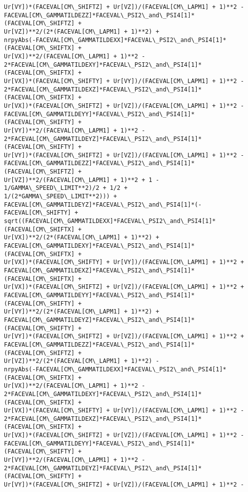 \documentclass[landscape,letterpaper,10pt,english]{article}
\begin{document}
\begin{Verbatim}[commandchars=\\\{\}]
Ur[VY])*(FACEVAL[CM\_SHIFTZ] + Ur[VZ])/(FACEVAL[CM\_LAPM1] + 1)**2 -
FACEVAL[CM\_GAMMATILDEZZ]*FACEVAL\_PSI2\_and\_PSI4[1]*(FACEVAL[CM\_SHIFTZ] +
Ur[VZ])**2/(2*(FACEVAL[CM\_LAPM1] + 1)**2) +
nrpyAbs(-FACEVAL[CM\_GAMMATILDEXX]*FACEVAL\_PSI2\_and\_PSI4[1]*(FACEVAL[CM\_SHIFTX] +
Ur[VX])**2/(FACEVAL[CM\_LAPM1] + 1)**2 -
2*FACEVAL[CM\_GAMMATILDEXY]*FACEVAL\_PSI2\_and\_PSI4[1]*(FACEVAL[CM\_SHIFTX] +
Ur[VX])*(FACEVAL[CM\_SHIFTY] + Ur[VY])/(FACEVAL[CM\_LAPM1] + 1)**2 -
2*FACEVAL[CM\_GAMMATILDEXZ]*FACEVAL\_PSI2\_and\_PSI4[1]*(FACEVAL[CM\_SHIFTX] +
Ur[VX])*(FACEVAL[CM\_SHIFTZ] + Ur[VZ])/(FACEVAL[CM\_LAPM1] + 1)**2 -
FACEVAL[CM\_GAMMATILDEYY]*FACEVAL\_PSI2\_and\_PSI4[1]*(FACEVAL[CM\_SHIFTY] +
Ur[VY])**2/(FACEVAL[CM\_LAPM1] + 1)**2 -
2*FACEVAL[CM\_GAMMATILDEYZ]*FACEVAL\_PSI2\_and\_PSI4[1]*(FACEVAL[CM\_SHIFTY] +
Ur[VY])*(FACEVAL[CM\_SHIFTZ] + Ur[VZ])/(FACEVAL[CM\_LAPM1] + 1)**2 -
FACEVAL[CM\_GAMMATILDEZZ]*FACEVAL\_PSI2\_and\_PSI4[1]*(FACEVAL[CM\_SHIFTZ] +
Ur[VZ])**2/(FACEVAL[CM\_LAPM1] + 1)**2 + 1 - 1/GAMMA\_SPEED\_LIMIT**2)/2 + 1/2 +
1/(2*GAMMA\_SPEED\_LIMIT**2))) +
FACEVAL[CM\_GAMMATILDEYZ]*FACEVAL\_PSI2\_and\_PSI4[1]*(-FACEVAL[CM\_SHIFTY] +
sqrt((FACEVAL[CM\_GAMMATILDEXX]*FACEVAL\_PSI2\_and\_PSI4[1]*(FACEVAL[CM\_SHIFTX] +
Ur[VX])**2/(2*(FACEVAL[CM\_LAPM1] + 1)**2) +
FACEVAL[CM\_GAMMATILDEXY]*FACEVAL\_PSI2\_and\_PSI4[1]*(FACEVAL[CM\_SHIFTX] +
Ur[VX])*(FACEVAL[CM\_SHIFTY] + Ur[VY])/(FACEVAL[CM\_LAPM1] + 1)**2 +
FACEVAL[CM\_GAMMATILDEXZ]*FACEVAL\_PSI2\_and\_PSI4[1]*(FACEVAL[CM\_SHIFTX] +
Ur[VX])*(FACEVAL[CM\_SHIFTZ] + Ur[VZ])/(FACEVAL[CM\_LAPM1] + 1)**2 +
FACEVAL[CM\_GAMMATILDEYY]*FACEVAL\_PSI2\_and\_PSI4[1]*(FACEVAL[CM\_SHIFTY] +
Ur[VY])**2/(2*(FACEVAL[CM\_LAPM1] + 1)**2) +
FACEVAL[CM\_GAMMATILDEYZ]*FACEVAL\_PSI2\_and\_PSI4[1]*(FACEVAL[CM\_SHIFTY] +
Ur[VY])*(FACEVAL[CM\_SHIFTZ] + Ur[VZ])/(FACEVAL[CM\_LAPM1] + 1)**2 +
FACEVAL[CM\_GAMMATILDEZZ]*FACEVAL\_PSI2\_and\_PSI4[1]*(FACEVAL[CM\_SHIFTZ] +
Ur[VZ])**2/(2*(FACEVAL[CM\_LAPM1] + 1)**2) -
nrpyAbs(-FACEVAL[CM\_GAMMATILDEXX]*FACEVAL\_PSI2\_and\_PSI4[1]*(FACEVAL[CM\_SHIFTX] +
Ur[VX])**2/(FACEVAL[CM\_LAPM1] + 1)**2 -
2*FACEVAL[CM\_GAMMATILDEXY]*FACEVAL\_PSI2\_and\_PSI4[1]*(FACEVAL[CM\_SHIFTX] +
Ur[VX])*(FACEVAL[CM\_SHIFTY] + Ur[VY])/(FACEVAL[CM\_LAPM1] + 1)**2 -
2*FACEVAL[CM\_GAMMATILDEXZ]*FACEVAL\_PSI2\_and\_PSI4[1]*(FACEVAL[CM\_SHIFTX] +
Ur[VX])*(FACEVAL[CM\_SHIFTZ] + Ur[VZ])/(FACEVAL[CM\_LAPM1] + 1)**2 -
FACEVAL[CM\_GAMMATILDEYY]*FACEVAL\_PSI2\_and\_PSI4[1]*(FACEVAL[CM\_SHIFTY] +
Ur[VY])**2/(FACEVAL[CM\_LAPM1] + 1)**2 -
2*FACEVAL[CM\_GAMMATILDEYZ]*FACEVAL\_PSI2\_and\_PSI4[1]*(FACEVAL[CM\_SHIFTY] +
Ur[VY])*(FACEVAL[CM\_SHIFTZ] + Ur[VZ])/(FACEVAL[CM\_LAPM1] + 1)**2 -

\end{Verbatim}
\end{document}

